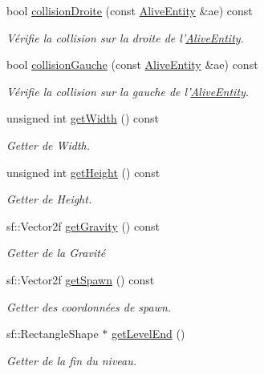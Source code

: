 \begin{DoxyCompactItemize}
bool \hyperlink{class_tile_map_ae19adae862a47ff532ebd6360e6a117d}{collision\+Droite} (const \hyperlink{class_alive_entity}{Alive\+Entity} \&ae) const 
\begin{DoxyCompactList}\small\item\em Vérifie la collision sur la droite de l'\hyperlink{class_alive_entity}{Alive\+Entity}. \end{DoxyCompactList}\item 
bool \hyperlink{class_tile_map_a1a01bab917e287eef1b2dd2985accc83}{collision\+Gauche} (const \hyperlink{class_alive_entity}{Alive\+Entity} \&ae) const 
\begin{DoxyCompactList}\small\item\em Vérifie la collision sur la gauche de l'\hyperlink{class_alive_entity}{Alive\+Entity}. \end{DoxyCompactList}\item 
unsigned int \hyperlink{class_tile_map_aad3bfcbf9997269b7af18e6cd66a83d3}{get\+Width} () const 
\begin{DoxyCompactList}\small\item\em Getter de Width. \end{DoxyCompactList}\item 
unsigned int \hyperlink{class_tile_map_aae7430209eb0f15d7a0d0476e2337c72}{get\+Height} () const 
\begin{DoxyCompactList}\small\item\em Getter de Height. \end{DoxyCompactList}\item 
sf\+::\+Vector2f \hyperlink{class_tile_map_a2d2cdb4a85f60bee4204c0163c29b7cd}{get\+Gravity} () const 
\begin{DoxyCompactList}\small\item\em Getter de la Gravité \end{DoxyCompactList}\item 
sf\+::\+Vector2f \hyperlink{class_tile_map_ab91140b620ac86fcce9649b385e1132f}{get\+Spawn} () const 
\begin{DoxyCompactList}\small\item\em Getter des coordonnées de spawn. \end{DoxyCompactList}\item 
sf\+::\+Rectangle\+Shape $\ast$ \hyperlink{class_tile_map_a9f0637a3a0afea5f28e846f11f22f6cf}{get\+Level\+End} ()
\begin{DoxyCompactList}\small\item\em Getter de la fin du niveau. \end{DoxyCompactList}\item 

\end{DoxyCompactItemize}
